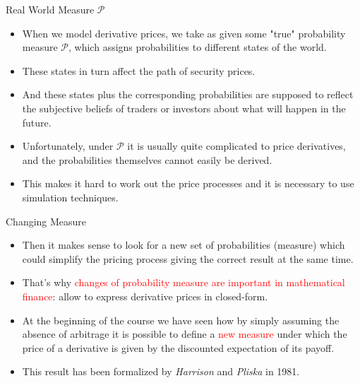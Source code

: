 \documentclass{beamer}
\begin{document}
\begin{frame}{Real World Measure $\mathcal{P}$}
  \begin{itemize}
  \item<1-> When we model derivative prices, we take as given some "true" probability measure $\mathcal{P}$, which assigns probabilities to different states of the world. 
  \item<2-> These states in turn affect the path of security prices. 
  \item<3-> And these states plus the corresponding probabilities are supposed to reflect the subjective beliefs of traders or investors about what will happen in the future.
  \item<4-> Unfortunately, under $\mathcal{P}$ it is usually quite complicated to price derivatives, and the probabilities themselves cannot easily be derived.
  \item<5-> This makes it hard to work out the price processes and it is necessary to use simulation techniques.
  \end{itemize}
\end{frame}

\begin{frame}{Changing Measure}
  \begin{itemize}
  \item<1-> Then it makes sense to look for a new set of probabilities (measure) which could simplify the pricing process giving the correct result at the same time.
  \item<2-> That's why \textcolor{red}{changes of probability measure are important in mathematical finance}: allow to express derivative prices in closed-form.
  \item<3-> At the beginning of the course we have seen how by simply assuming the absence of arbitrage it is possible to define a \textcolor{red}{new measure} under which the price of a derivative is given by the discounted expectation of its payoff.
  \item<4-> This result has been formalized by \emph{Harrison} and \emph{Pliska} in 1981. 
  \end{itemize}
\end{frame}
\end{document}
